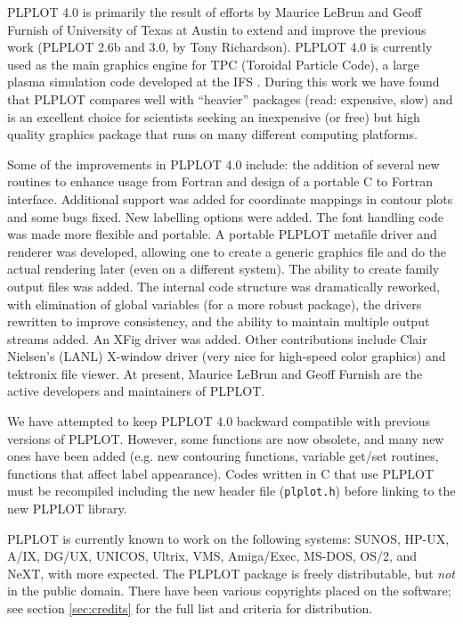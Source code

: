 PLPLOT 4.0 is primarily the result of efforts by Maurice LeBrun and
Geoff Furnish of University of Texas at Austin to extend and improve
the previous work (PLPLOT 2.6b and 3.0, by Tony Richardson).  PLPLOT
4.0 is currently used as the main graphics engine for TPC (Toroidal
Particle Code), a large plasma simulation code developed at the IFS
\cite{lebrun89a}.  During this work we have found that PLPLOT compares
well with ``heavier'' packages (read: expensive, slow) and is an
excellent choice for scientists seeking an inexpensive (or free) but
high quality graphics package that runs on many different computing
platforms.

Some of the improvements in PLPLOT 4.0 include: the addition of
several new routines to enhance usage from Fortran and design of a
portable C to Fortran interface.  Additional support was added for
coordinate mappings in contour plots and some bugs fixed.  New
labelling options were added.  The font handling code was made more
flexible and portable.  A portable PLPLOT metafile driver and renderer
was developed, allowing one to create a generic graphics file and do
the actual rendering later (even on a different system).  The ability
to create family output files was added.  The internal code structure
was dramatically reworked, with elimination of global variables (for a
more robust package), the drivers rewritten to improve consistency,
and the ability to maintain multiple output streams added.  An XFig
driver was added.  Other contributions include Clair Nielsen's (LANL)
X-window driver (very nice for high-speed color graphics) and
tektronix file viewer.  At present, Maurice LeBrun and Geoff Furnish
are the active developers and maintainers of PLPLOT.

We have attempted to keep PLPLOT 4.0 backward compatible with previous
versions of PLPLOT.  However, some functions are now obsolete, and
many new ones have been added (e.g.  new contouring functions,
variable get/set routines, functions that affect label appearance).
Codes written in C that use PLPLOT must be recompiled including the
new header file ({\tt plplot.h}) before linking to the new PLPLOT
library.

PLPLOT is currently known to work on the following systems: SUNOS,
HP-UX, A/IX, DG/UX, UNICOS, Ultrix, VMS, Amiga/Exec, MS-DOS, OS/2, and
NeXT, with more expected.  The PLPLOT package is freely distributable,
but {\em not\/} in the public domain.  There have been various
copyrights placed on the software; see section \ref{sec:credits} for
the full list and criteria for distribution.

